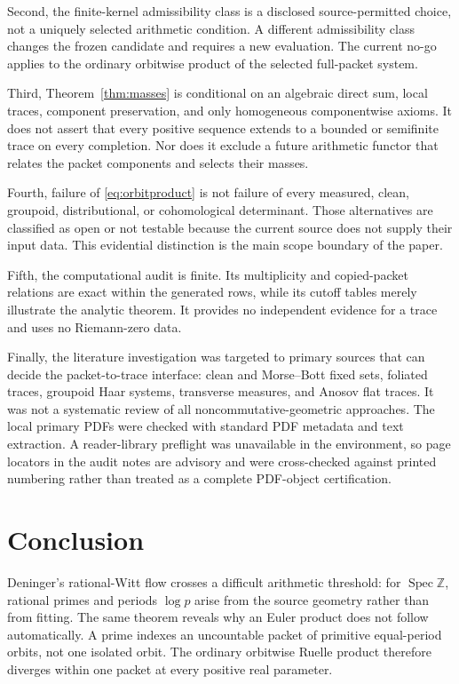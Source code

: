 \documentclass[11pt]{article}
\theoremstyle{definition}
\theoremstyle{remark}
\newcommand{\Z}{\mathbb{Z}}
\newcommand{\Spec}{\operatorname{Spec}}
\begin{document}
Second, the finite-kernel admissibility class is a disclosed source-permitted
choice, not a uniquely selected arithmetic condition.  A different
admissibility class changes the frozen candidate and requires a new
evaluation.  The current no-go applies to the ordinary orbitwise product of
the selected full-packet system.

Third, Theorem~\ref{thm:masses} is conditional on an algebraic direct sum,
local traces, component preservation, and only homogeneous componentwise
axioms.  It does not assert that every positive sequence extends to a bounded
or semifinite trace on every completion.  Nor does it exclude a future
arithmetic functor that relates the packet components and selects their
masses.

Fourth, failure of \eqref{eq:orbitproduct} is not failure of every measured,
clean, groupoid, distributional, or cohomological determinant.  Those
alternatives are classified as open or not testable because the current source
does not supply their input data.  This evidential distinction is the main
scope boundary of the paper.

Fifth, the computational audit is finite.  Its multiplicity and copied-packet
relations are exact within the generated rows, while its cutoff tables merely
illustrate the analytic theorem.  It provides no independent evidence for a
trace and uses no Riemann-zero data.

Finally, the literature investigation was targeted to primary sources that
can decide the packet-to-trace interface: clean and Morse--Bott fixed sets,
foliated traces, groupoid Haar systems, transverse measures, and Anosov flat
traces.  It was not a systematic review of all noncommutative-geometric
approaches.  The local primary PDFs were checked with standard PDF metadata
and text extraction.  A reader-library preflight was unavailable in the
environment, so page locators in the audit notes are advisory and were
cross-checked against printed numbering rather than treated as a complete
PDF-object certification.

\section{Conclusion}

Deninger's rational-Witt flow crosses a difficult arithmetic threshold: for
\(\Spec\Z\), rational primes and periods \(\log p\) arise from the source
geometry rather than from fitting.  The same theorem reveals why an Euler
product does not follow automatically.  A prime indexes an uncountable
packet of primitive equal-period orbits, not one isolated orbit.  The
ordinary orbitwise Ruelle product therefore diverges within one packet at
every positive real parameter.
\end{document}
